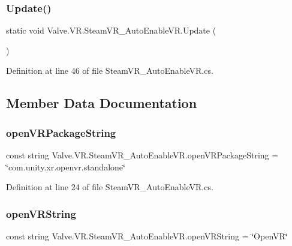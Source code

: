 \subsubsection{\texorpdfstring{Update()}{Update()}}
{\footnotesize\ttfamily static void Valve.\+V\+R.\+Steam\+V\+R\+\_\+\+Auto\+Enable\+V\+R.\+Update (\begin{DoxyParamCaption}{ }\end{DoxyParamCaption})\hspace{0.3cm}{\ttfamily [static]}}



Definition at line 46 of file Steam\+V\+R\+\_\+\+Auto\+Enable\+V\+R.\+cs.



\subsection{Member Data Documentation}
\mbox{\label{class_valve_1_1_v_r_1_1_steam_v_r___auto_enable_v_r_afe964c4b4fb43beb8d04b109500b74f9}} 
\subsubsection{\texorpdfstring{openVRPackageString}{openVRPackageString}}
{\footnotesize\ttfamily const string Valve.\+V\+R.\+Steam\+V\+R\+\_\+\+Auto\+Enable\+V\+R.\+open\+V\+R\+Package\+String = \char`\"{}com.\+unity.\+xr.\+openvr.\+standalone\char`\"{}\hspace{0.3cm}{\ttfamily [protected]}}



Definition at line 24 of file Steam\+V\+R\+\_\+\+Auto\+Enable\+V\+R.\+cs.

\mbox{\label{class_valve_1_1_v_r_1_1_steam_v_r___auto_enable_v_r_aad2df628366f5d024088acafb05e5b13}} 
\subsubsection{\texorpdfstring{openVRString}{openVRString}}
{\footnotesize\ttfamily const string Valve.\+V\+R.\+Steam\+V\+R\+\_\+\+Auto\+Enable\+V\+R.\+open\+V\+R\+String = \char`\"{}Open\+VR\char`\"{}\hspace{0.3cm}{\ttfamily [protected]}}



